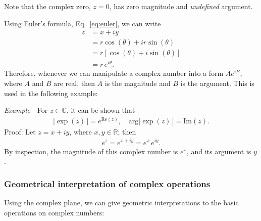 \documentclass[10pt,a4paper]{article}
\begin{document}
Note that the complex zero, $z = 0$, has zero magnitude and
\textit{undefined} argument.

Using Euler's formula, Eq.~\eqref{eq:euler}, we can write
\begin{align}
  z &= x + i y \\
  &= r\cos(\theta) + i r\sin(\theta)\\
  &= r \left[\cos(\theta) + i \sin(\theta)\right] \\
  &= r \, e^{i\theta}.
\end{align}
Therefore, whenever we can manipulate a complex number into a form $A
e^{iB}$, where $A$ and $B$ are real, then $A$ is the magnitude and $B$
is the argument.  This is used in the following example:

\begin{framed}\noindent
  \textit{Example}---For $z \in \mathbb{C}$, it can be shown that
  \begin{align}
    \displaystyle \big|\exp(z)\,\big| = e^{\mathrm{Re}(z)}, \quad \mathrm{arg}\big[\exp(z)\,\big] = \mathrm{Im}(z).
  \end{align}
  Proof: Let $z = x + i y$, where $x, y \in \mathbb{R}$; then
  \begin{align}
    e^{z} = e^{x + i y} = e^x \, e^{iy}.
  \end{align}
  By inspection, the magnitude of this complex number is $e^x$, and
  its argument is $y$.
\end{framed}

\subsubsection{Geometrical interpretation of complex operations}
\label{geometrical-interpretation-of-complex-operations}

Using the complex plane, we can give geometric interpretations to the basic operations on complex numbers: 
\end{document}

